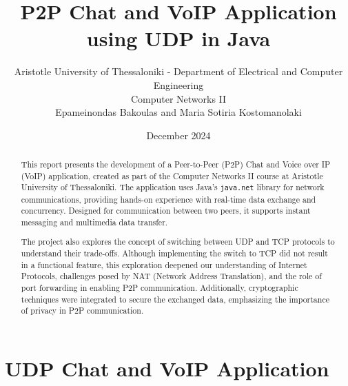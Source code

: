 \documentclass{article}
\title{P2P Chat and VoIP Application using UDP in Java}
\author{
    \small Aristotle University of Thessaloniki - Department of Electrical and Computer Engineering \\[0.5em]
    \small Computer Networks II\\[1.5em]
    Epameinondas Bakoulas and Maria Sotiria Kostomanolaki \\[1em]
}
\date{December 2024}
\begin{document}
\maketitle

\begin{abstract}
This report presents the development of a Peer-to-Peer (P2P) Chat and Voice over IP (VoIP) application, created as part of the Computer Networks II course at Aristotle University of Thessaloniki. The application uses Java's \texttt{java.net} library for network communications, providing hands-on experience with real-time data exchange and concurrency. Designed for communication between two peers, it supports instant messaging and multimedia data transfer.

The project also explores the concept of switching between UDP and TCP protocols to understand their trade-offs. Although implementing the switch to TCP did not result in a functional feature, this exploration deepened our understanding of Internet Protocols, challenges posed by NAT (Network Address Translation), and the role of port forwarding in enabling P2P communication. Additionally, cryptographic techniques were integrated to secure the exchanged data, emphasizing the importance of privacy in P2P communication.
\end{abstract}

\section {UDP Chat and VoIP Application}
\end{document}
